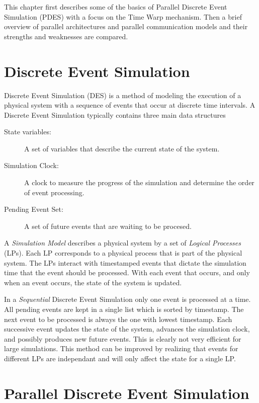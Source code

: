 \documentclass[11pt]{book}
\begin{document}
This chapter first describes some of the basics of Parallel Discrete Event Simulation (PDES)
with a focus on the Time Warp mechanism.  Then a brief overview of parallel architectures and
parallel communication models and their strengths and weaknesses are compared.

\section{Discrete Event Simulation}

Discrete Event Simulation (DES) is a method of modeling the execution of a physical system
with a sequence of events that occur at discrete time intervals.  A Discrete Event Simulation
typically contains three main data structures

\begin{description}
    \item[State variables: ] A set of variables that describe the current state of the system.
    \item[Simulation Clock: ] A clock to measure the progress of the simulation and determine
        the order of event processing.
    \item[Pending Event Set: ] A set of future events that are waiting to be procesed.
\end{description}

\noindent
A \emph{Simulation Model} describes a physical system by a set of \emph{Logical Processes}
(LPs).  Each LP corresponds to a physical process that is part of the physical system.  The
LPs interact with timestamped events that dictate the simulation time that the event should
be processed.  With each event that occurs, and only when an event occurs, the state of the
system is updated.

In a \emph{Sequential} Discrete Event Simulation only one event is processed at a time.
All pending events are kept in a single list which is sorted by timestamp.  The next event
to be processed is always the one with lowest timestamp.  Each successive event updates the
state of the system, advances the simulation clock, and possibly produces new future events.
This is clearly not very efficient for large simulations.  This method can be improved by
realizing that events for different LPs are independant and will only affect the state for
a single LP.

\section{Parallel Discrete Event Simulation}
\end{document}
